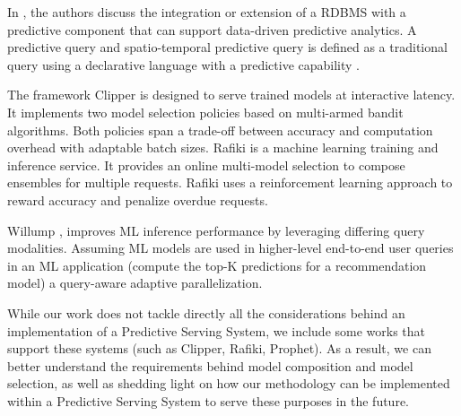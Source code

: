 In \cite{Akdere2011}, the authors discuss the integration or extension of a RDBMS with a predictive component that can support data-driven predictive analytics. A predictive query and spatio-temporal predictive query is defined as a traditional query using a declarative language with a predictive capability \cite{Hendawi2012}. 

The framework Clipper \cite{Crankshaw2017} is designed to serve trained models at interactive latency. It implements two model selection policies based on multi-armed bandit algorithms. Both policies span a trade-off between accuracy and computation overhead with adaptable batch sizes. Rafiki \cite{Wang2018} is a machine learning training and inference service. It provides an online multi-model selection to compose ensembles for multiple requests. Rafiki uses a reinforcement learning approach to reward accuracy and penalize overdue requests. 

Willump \cite{Kraft2019}, improves ML inference performance by leveraging differing query modalities. Assuming ML models are used in higher-level end-to-end user queries in an ML application (compute the top-K predictions for a recommendation model) a query-aware adaptive parallelization.

While our work does not tackle directly all the considerations behind an implementation of a Predictive Serving System, we include some works that support these systems (such as Clipper, Rafiki, Prophet). As a result, we can better understand the requirements behind model composition and model selection, as well as shedding light on how our methodology can be implemented within a Predictive Serving System to serve these purposes in the future.